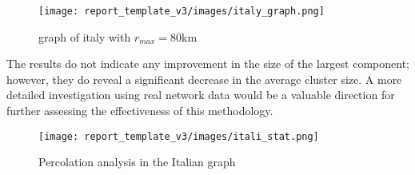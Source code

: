 \begin{figure}
    \centering
    \texttt{[image: report\_template\_v3/images/italy\_graph.png]}
    \caption{\footnotesize graph of italy with $r_{max}=80$km }
\end{figure}

The results do not indicate any improvement in the size of the largest component; however, they do reveal a significant decrease in the average cluster size. A more detailed investigation using real network data would be a valuable direction for further assessing the effectiveness of this methodology.

\begin{figure}
    \centering
    \texttt{[image: report\_template\_v3/images/itali\_stat.png]}
    \caption{\footnotesize  Percolation analysis in the Italian graph}
\end{figure}



\newpage
